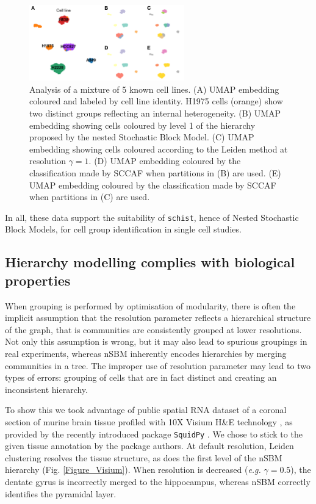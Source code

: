 \documentclass[10pt]{article}
\begin{document}
\begin{figure}[H]
\centering
\includegraphics[keepaspectratio,width=0.6\textwidth,height=\textheight]{FigureTian.png}
\caption[]{Analysis of a mixture of 5 known cell lines. (A) UMAP embedding coloured and labeled by cell line identity. H1975 cells (orange) show two distinct groups reflecting an internal heterogeneity. (B) UMAP embedding showing cells coloured by level 1 of the hierarchy proposed by the nested Stochastic Block Model. (C) UMAP embedding showing cells coloured according to the Leiden method at resolution $\gamma = 1$. (D) UMAP embedding coloured by the classification made by SCCAF when partitions in (B) are used. (E) UMAP embedding coloured by the classification made by SCCAF when partitions in (C) are used.}\label{FigureTian}
\end{figure}

In all, these data support the suitability of \texttt{schist}, hence of Nested Stochastic Block Models, for cell group identification in single cell studies. 

\subsection*{Hierarchy modelling complies with biological properties}

When grouping is performed by optimisation of modularity, there is often the implicit assumption that the resolution parameter reflects a hierarchical structure of the graph, that is communities are consistently grouped at lower resolutions. Not only this assumption is wrong, but it may also lead to spurious groupings in real experiments, whereas nSBM inherently encodes hierarchies by merging communities in a tree. The improper use of resolution parameter may lead to two types of errors: grouping of cells that are in fact distinct and creating an inconsistent hierarchy. 

To show this we took advantage of public spatial RNA dataset of a coronal section of murine brain tissue profiled with 10X Visium H\&E technology \cite{Gracia_Villacampa_2020}, as provided by the recently introduced package \texttt{SquidPy} \cite{Palla_Theis_2021}. We chose to stick to the given tissue annotation by the package authors. At default resolution, Leiden clustering resolves the tissue structure, as does the first level of the nSBM hierarchy (Fig. \ref{Figure_Visium}). When resolution is decreased (\emph{e.g.} $\gamma = 0.5$), the dentate gyrus is incorrectly merged to the hippocampus, whereas nSBM correctly identifies the pyramidal layer. 
\end{document}

